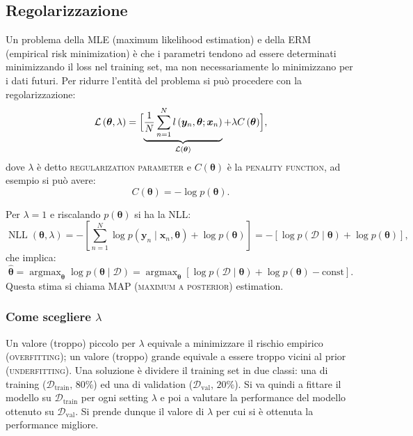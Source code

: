 \documentclass[10pt]{article}
\DeclareMathOperator*{\argmax}{argmax}
\DeclareMathOperator{\NLL}{NLL}
\newcommand{\ve}[1]{\bm{#1}}
\newcommand{\im}[1]{\textsc{#1}}
\newcommand{\cond}{\mid}
\newcommand{\pare}[1]{
	\ensuremath{\left(#1\right)}
}
\newcommand{\spare}[1]{
	\ensuremath{\left[#1\right]}
}
\theoremstyle{definition}
\begin{document}
\subsection{Regolarizzazione}
Un problema della MLE (maximum likelihood estimation) e della ERM (empirical
risk minimization) è che i parametri tendono ad essere determinati minimizzando
il loss nel training set, ma non necessariamente lo minimizzano per i dati
futuri. Per ridurre l'entità del problema si può procedere con la
regolarizzazione:
\begin{equation}
\mathcal{L}\pare{\ve{\theta}, \lambda} = \Bigl[ \underbrace{\frac{1}{N}\sum_{n=1}^N l\pare{\ve{y}_n, \ve{\theta}; \ve{x}_n}}_{\mathcal{L}\pare{\ve{\theta}}} + \lambda C\pare{\ve{\theta}} \Bigr],
\end{equation}
dove $\lambda$ è detto \im{regularization parameter} e $C\pare{\ve{\theta}}$ è
la \im{penality function}, ad esempio si può avere:
\[
C\pare{\ve{\theta}} = -\log{p\pare{\ve{\theta}}}.
\]

Per \(\lambda = 1\) e riscalando \(p\pare{\ve{\theta}}\) si ha la NLL:
\begin{equation}
\NLL\pare{\ve{\theta}, \lambda} = - \spare{\sum_{n=1}^N\log{p\pare{\ve{y}_n\cond\ve{x}_n,\ve{\theta}}} + \log{p\pare{\ve{\theta}}}} = -\spare{\log{p\pare{\mathcal{D}\cond\ve{\theta}}} + \log{p\pare{\ve{\theta}}}},
\end{equation}
che implica:
\begin{equation}
\hat{\ve{\theta}} = \argmax_{\ve{\theta}}\log{p\pare{\ve{\theta}\cond\mathcal{D}}} = \argmax_{\ve{\theta}}\spare{\log{p\pare{\mathcal{D}\cond\ve{\theta}}} + \log{p\pare{\ve{\theta}}} - \text{const}}.
\end{equation}
Questa stima si chiama MAP (\im{maximum a posterior}) estimation.


\subsubsection{Come scegliere \(\lambda\)}
Un valore (troppo) piccolo per \(\lambda\) equivale a minimizzare il rischio
empirico (\im{overfitting}); un valore (troppo) grande equivale a essere troppo
vicini al prior (\im{underfitting}). Una soluzione è dividere il training set in
due classi: una di training ($\mathcal{D}_{\text{train}},\,80\%$) ed una di
validation ($\mathcal{D}_{\text{val}},\,20\%$). Si va quindi a fittare il
modello su $\mathcal{D}_{\text{train}}$ per ogni setting $\lambda$ e poi a
valutare la performance del modello ottenuto su $\mathcal{D}_{\text{val}}$. Si
prende dunque il valore di $\lambda$ per cui si è ottenuta la performance
migliore.
\end{document}
